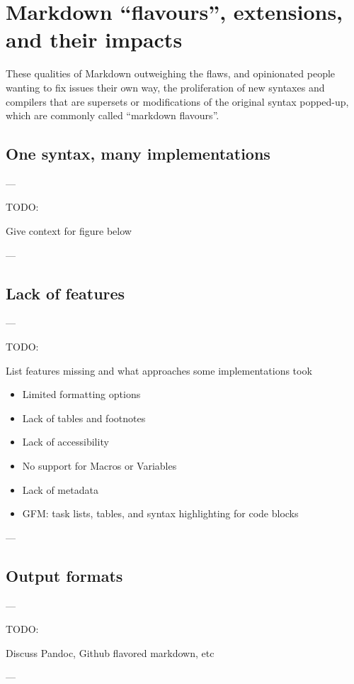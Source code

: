 \chapter{Markdown ``flavours'', extensions, and their impacts}
\label{chap:proliferation}

\vspace{1cm}

These qualities of Markdown outweighing the flaws, and opinionated people wanting to fix issues their own way, the proliferation of new syntaxes
and compilers that are supersets or modifications of the original syntax popped-up, which are commonly called ``markdown flavours''.

\section{One syntax, many implementations}

---

TODO:

Give context for figure below

---



\section{Lack of features}

---

TODO:

List features missing and what approaches some implementations took

\begin{itemize}
    \item Limited formatting options
    \item Lack of tables and footnotes
    \item Lack of accessibility
    \item No support for Macros or Variables
    \item Lack of metadata
    \item GFM: task lists, tables, and syntax highlighting for code blocks
\end{itemize}

---

\section{Output formats}

---

TODO:

Discuss Pandoc, Github flavored markdown, etc

---


\cite{voegler2014markdown}